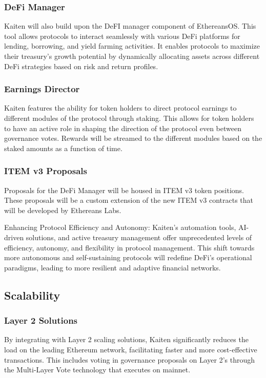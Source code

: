\documentclass[11pt,oneside,a4paper]{article}
\begin{document}
\subsubsection{DeFi Manager}
Kaiten will also build upon the DeFI manager component of EthereansOS. This tool allows protocols to interact seamlessly with various DeFi platforms for lending, borrowing, and yield farming activities. It enables protocols to maximize their treasury's growth potential by dynamically allocating assets across different DeFi strategies based on risk and return profiles.

\subsubsection{Earnings Director}
Kaiten features the ability for token holders to direct protocol earnings to different modules of the protocol through staking. This allows for token holders to have an active role in shaping the direction of the protocol even between governance votes. Rewards will be streamed to the different modules based on the staked amounts as a function of time.

\subsubsection{ITEM v3 Proposals}
Proposals for the DeFi Manager will be housed in ITEM v3 token positions. These proposals will be a custom extension of the new ITEM v3 contracts that will be developed by Ethereans Labs.

Enhancing Protocol Efficiency and Autonomy: Kaiten's automation tools, AI-driven solutions, and active treasury management offer unprecedented levels of efficiency, autonomy, and flexibility in protocol management. This shift towards more autonomous and self-sustaining protocols will redefine DeFi’s operational paradigms, leading to more resilient and adaptive financial networks.

\subsection{Scalability}

\subsubsection{Layer 2 Solutions}
By integrating with Layer 2 scaling solutions, Kaiten significantly reduces the load on the leading Ethereum network, facilitating faster and more cost-effective transactions. This includes voting in governance proposals on Layer 2’s through the Multi-Layer Vote technology that executes on mainnet.
\end{document}
